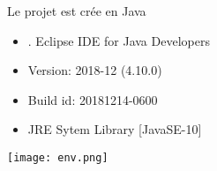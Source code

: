 

Le projet est crée en Java 
\begin{itemize}

    \item . Eclipse IDE for Java Developers
    \item Version: 2018-12 (4.10.0)
    \item Build id: 20181214-0600
    \item JRE Sytem Library [JavaSE-10]
    
    

\end{itemize}

\texttt{[image: env.png]}%